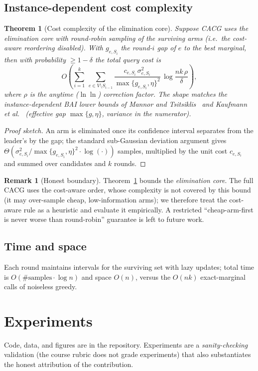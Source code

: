 \documentclass[11pt]{article}
\theoremstyle{plain}
\newtheorem{theorem}{Theorem}
\theoremstyle{definition}
\newtheorem{remark}{Remark}
\begin{document}
\subsection{Instance-dependent cost complexity}
\begin{theorem}[Cost complexity of the elimination core]\label{thm:cost}
Suppose CACG uses the elimination core with round-robin sampling of the
surviving arms (i.e.\ the cost-aware reordering disabled). With
$g_{e,S_i}$ the round-$i$ gap of $e$ to the best marginal, then with
probability $\ge 1-\delta$ the total query cost is
\[
O\!\left(\sum_{i=1}^{k}\ \sum_{e\in V\setminus S_{i-1}}
   \frac{c_{e,S_i}\,\sigma_{e,S_i}^2}{\max\{g_{e,S_i},\eta\}^2}
   \,\log\frac{nk\,\rho}{\delta}\right),
\]
where $\rho$ is the anytime ($\ln\ln$) correction factor. The shape matches
the instance-dependent BAI lower bounds of Mannor and
Tsitsiklis~\cite{MannorTsitsiklis2004} and Kaufmann et
al.~\cite{KaufmannCappeGarivier2016} (effective gap $\max\{g,\eta\}$,
variance in the numerator).
\end{theorem}
\begin{proof}[Proof sketch]
An arm is eliminated once its confidence interval separates from the
leader's by the gap; the standard sub-Gaussian deviation argument gives
$\Theta(\sigma_{e,S_i}^2/\max\{g_{e,S_i},\eta\}^2\cdot\log(\cdot))$ samples,
multiplied by the unit cost $c_{e,S_i}$ and summed over candidates and $k$
rounds.
\end{proof}
\begin{remark}[Honest boundary]
Theorem~\ref{thm:cost} bounds the \emph{elimination core}. The full CACG
uses the cost-aware order, whose complexity is not covered by this bound
(it may over-sample cheap, low-information arms); we therefore treat the
cost-aware rule as a heuristic and evaluate it empirically. A restricted
``cheap-arm-first is never worse than round-robin'' guarantee is left to
future work.
\end{remark}

\subsection{Time and space}
Each round maintains intervals for the surviving set with lazy updates;
total time is $O(\text{\#samples}\cdot\log n)$ and space $O(n)$, versus the
$O(nk)$ exact-marginal calls of noiseless greedy.

\section{Experiments}\label{sec:experiments}
Code, data, and figures are in the repository. Experiments are a
\emph{sanity-checking} validation (the course rubric does not grade
experiments) that also substantiates the honest attribution of the
contribution.
\end{document}
